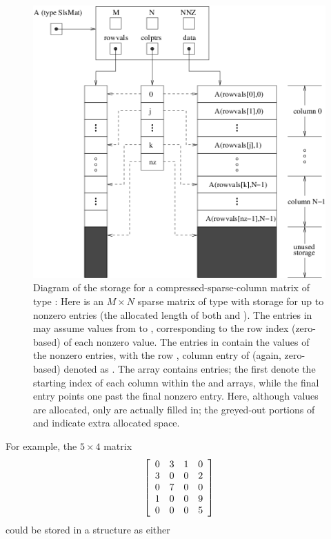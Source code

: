\documentclass[letterpaper,10pt,english]{sphinxmanual}
\begin{document}
\begin{figure}[htbp]
\centering
\capstart

\includegraphics{cscmat.png}
\caption{Diagram of the storage for a compressed-sparse-column matrix of
type {\hyperref[linear_solvers/SLS:SlsMat]{}}: Here  is an $M \times N$ sparse
matrix of type {\hyperref[linear_solvers/SLS:SlsMat]{}} with storage for up to 
nonzero entries (the allocated length of both  and
).  The entries in  may assume values from
 to , corresponding to the row index (zero-based) of
each nonzero value.  The entries in  contain the values of
the nonzero entries, with the row , column  entry of
 (again, zero-based) denoted as .  The 
array contains  entries; the first  denote the starting
index of each column within the  and  arrays,
while the final entry points one past the final nonzero entry.
Here, although  values are allocated, only  are
actually filled in; the greyed-out portions of  and
 indicate extra allocated space.}\label{linear_solvers/SLS:sls-figure}\end{figure}

For example, the $5\times 4$ matrix
\begin{gather}
\begin{split}\left[\begin{array}{cccc}
   0 & 3 & 1 & 0\\
   3 & 0 & 0 & 2\\
   0 & 7 & 0 & 0\\
   1 & 0 & 0 & 9\\
   0 & 0 & 0 & 5
\end{array}\right]\end{split}\notag
\end{gather}
could be stored in a {\hyperref[linear_solvers/SLS:SlsMat]{}} structure as either
\end{document}
